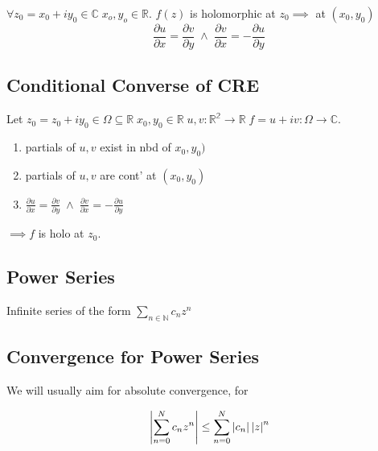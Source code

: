 $\forall z_0 = x_0 + iy_0 \in \mathbb{C} \; x_o, y_o \in \mathbb{R}$. $f(z)$ is holomorphic at $z_0 \implies$ at $(x_0, y_0)$
\begin{equation*}
	\frac{\partial u}{\partial x} = \frac{\partial v}{\partial y} \; \land \; \frac{\partial v}{\partial x} = - \frac{\partial u}{\partial y}  
\end{equation*}


\subsection{Conditional Converse of CRE} %
\label{sub:conditional_converse_of_cre}
Let $z_0 = z_0 + iy_0 \in \mathbb{\Omega} \subseteq \mathbb{R} \; x_0, y_0 \in \mathbb{R} \; u, v : \mathbb{R^2} \to \mathbb{R} \; f = u + iv : \Omega \to \mathbb{C}$.
\begin{enumerate}
	\item partials of $u, v$ exist in nbd of $x_0, y_0)$
	\item partials of $u, v$ are cont' at $(x_0, y_0)$
	\item $\frac{\partial u}{\partial x} = \frac{\partial v}{\partial y} \; \land \; \frac{\partial v}{\partial x} = - \frac{\partial u}{\partial y}  $
\end{enumerate}
$\implies f$ is holo at $z_0$.


\subsection{Power Series} %
\label{sub:power_series}

Infinite series of the form $\sum_{n \in \mathbb{N}} c_n z^n$


\subsection{Convergence for Power Series} %
\label{sub:convergence_for_power_series}

We will usually aim for absolute convergence, for

\begin{equation*}
	\left|\sum_{n=0}^{N} c_n z^n\right| \leq \sum_{n=0}^{N} \left|c_n\right| \left|z\right|^n
\end{equation*}

